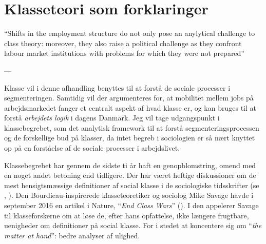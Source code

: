 


\chapter{Klasseteori som forklaringer \label{kapitel_teori_klasse}}

\vspace{20pt} \epigraphfontsize{\small\itshape}
\epigraphfontsize{\small\itshape}
\epigraph{“Shifts in the employment structure do not only pose an anylytical challenge to class theory: moreover, they also raise a political challenge as they confront labour market institutions with problems for which they were not prepared”}{--- \textup{\parencite[4]{Oesch2006a}}}



Klasse vil i denne afhandling benyttes til at forstå de sociale processer i segmenteringen. Samtidig vil der argumenteres for, at mobilitet mellem jobs på arbejdsmarkedet fanger et centralt aspekt af hvad klasse er, og kan bruges til at forstå \emph{arbejdets logik} i dagens Danmark. Jeg vil tage udgangspunkt i klassebegrebet, som det analytisk framework til at forstå segmenteringsprocessen  og de forskellige bud på klasser, da intet begreb i sociologien er så nært knyttet op på en forståelse af de sociale processer i arbejdslivet. 

Klassebegrebet har gennem de sidste ti år haft en genopblomstring, omend med en noget andet betoning end tidligere. %
Der har været heftige diskussioner om de mest hensigtsmæssige definitioner af social klasse i de sociologiske tidsskrifter (se \cite{Grusky2001}, \cite{Goldthorpe2002}). Den Bourdieau-inspirerede klasseteoretiker og sociolog Mike Savage havde i september 2016 en artikel i Nature, “\emph{End Class Wars}” (\citeyear{Savage2016}). I den appelerer Savage til klasseforskerne om at løse de, efter hans opfattelse, ikke længere frugtbare, uenigheder om definitioner på social klasse. For i stedet at koncentere sig om “\emph{the matter at hand}”: bedre analyser af ulighed. 

